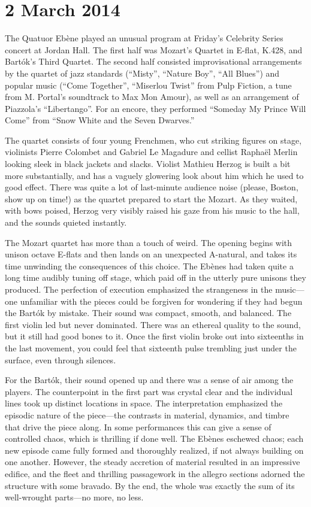 \chapter{2 March 2014}

The Quatuor Ebène played an unusual program at Friday’s Celebrity Series concert at Jordan Hall. The first half was Mozart’s Quartet in E-flat, K.428, and Bartók’s Third Quartet. The second half consisted improvisational arrangements by the quartet of jazz standards (“Misty”, “Nature Boy”, “All Blues”) and popular music (“Come Together”, “Miserlou Twist” from Pulp Fiction, a tune from M. Portal’s soundtrack to Max Mon Amour), as well as an arrangement of Piazzola’s “Libertango”. For an encore, they performed “Someday My Prince Will Come” from “Snow White and the Seven Dwarves.”

The quartet consists of four young Frenchmen, who cut striking figures on stage, violinists Pierre Colombet and Gabriel Le Magadure and cellist Raphaël Merlin looking sleek in black jackets and slacks. Violist Mathieu Herzog is built a bit more substantially, and has a vaguely glowering look about him which he used to good effect. There was quite a lot of last-minute audience noise (please, Boston, show up on time!) as the quartet prepared to start the Mozart. As they waited, with bows poised, Herzog very visibly raised his gaze from his music to the hall, and the sounds quieted instantly.

The Mozart quartet has more than a touch of weird. The opening begins with unison octave E-flats and then lands on an unexpected A-natural, and takes its time unwinding the consequences of this choice. The Ebènes had taken quite a long time audibly tuning off stage, which paid off in the utterly pure unisons they produced. The perfection of execution emphasized the strangeness in the music—one unfamiliar with the pieces could be forgiven for wondering if they had begun the Bartók by mistake. Their sound was compact, smooth, and balanced. The first violin led but never dominated. There was an ethereal quality to the sound, but it still had good bones to it. Once the first violin broke out into sixteenths in the last movement, you could feel that sixteenth pulse trembling just under the surface, even through silences.

For the Bartók, their sound opened up and there was a sense of air among the players. The counterpoint in the first part was crystal clear and the individual lines took up distinct locations in space. The interpretation emphasized the episodic nature of the piece—the contrasts in material, dynamics, and timbre that drive the piece along. In some performances this can give a sense of controlled chaos, which is thrilling if done well. The Ebènes eschewed chaos; each new episode came fully formed and thoroughly realized, if not always building on one another. However, the steady accretion of material resulted in an impressive edifice, and the fleet and thrilling passagework in the allegro sections adorned the structure with some bravado. By the end, the whole was exactly the sum of its well-wrought parts—no more, no less.

